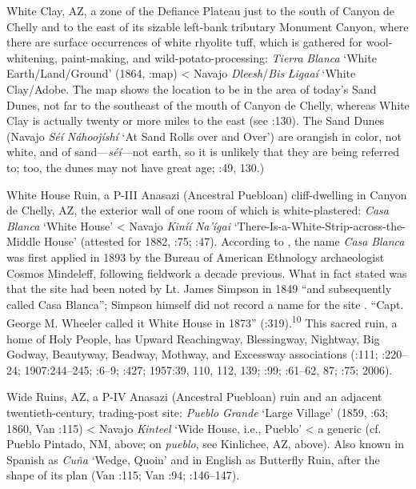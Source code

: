 White Clay, AZ, a zone of the Defiance Plateau just to the south of Canyon de Chelly and to the east of its sizable left-bank tributary Monument Canyon, where there are surface occurrences of white rhyolite tuff, which is gathered for wool-whitening, paint-making, and wild-potato-processing:  \textit{Tierra} \textit{Blanca} ‘White Earth/Land/Ground’ (1864, \citealt{Madsen2010}:map) < Navajo \textit{Dleesh}/\textit{Bis} \textit{Łigaaí} ‘White Clay/Adobe.  The map shows the location to be in the area of today’s Sand Dunes, not far to the southeast of the mouth of Canyon de Chelly, whereas White Clay is actually twenty or more miles to the east (see \citealt{Jett2010}:130).  The Sand Dunes (Navajo \textit{Séí} \textit{Náhoojíshí} ‘At Sand Rolls over and Over’) are orangish in color, not white, and of sand—\textit{séí}—not earth, so it is unlikely that they are being referred to; too, the dunes may not have great age; \citealt{Jett2001}:49, 130.)

White House Ruin, a P-III Anasazi (Ancestral Puebloan) cliff-dwelling in Canyon de Chelly, AZ, the exterior wall of one room of which is white-plastered:  \textit{Casa} \textit{Blanca} ‘White House’ < Navajo \textit{Kiníí} \textit{Na’ígai} ‘There-Is-a-White-Strip-across-the-Middle House’ (attested for 1882, \citealt{Jett2001}:75; \citealt{Linford2000}:47).  According to \citet[41]{Bailey1964a}, the name \textit{Casa} \textit{Blanca} was first applied in 1893 by the Bureau of American Ethnology archaeologist Cosmos Mindeleff, following fieldwork a decade previous.  What \citet[104]{Mindeleff1897} in fact stated was that the site had been noted by Lt. James Simpson in 1849 “and subsequently called Casa Blanca”; Simpson himself did not record a name for the site \citep[8]{McNitt1964}.  “Capt. George M. Wheeler called it White House in 1873” (\citealt{BarnesGranger1960}:319).\textsuperscript{10}  This sacred ruin, a home of Holy People, has Upward Reachingway, Blessingway, Nightway, Big Godway, Beautyway, Beadway, Mothway, and Excessway associations (\citealt{Klah1942}:111; \citealt{Matthews1902}:220–24; 1907:244–245; \citealt{Wheelwright1938}:6–9; \citealt{Wyman1970}:427; 1957:39, 110, 112, 139; \citealt{Levy1998}:99; \citealt{Haile1978}:61–62, 87; \citealt{Jett2001}:75; 2006).

Wide Ruins, AZ, a P-IV Anasazi (Ancestral Puebloan) ruin and an adjacent twentieth-century, trading-post site:  \textit{Pueblo} \textit{Grande} ‘Large Village’ (1859, \citealt{Bailey1964a}:63; 1860, Van \citealt{Valkenburgh1999}:115) < Navajo \textit{Kinteel} ‘Wide House, i.e., Pueblo’ \citep[209]{Haile1950} < a generic (cf. Pueblo Pintado, NM, above; on \textit{pueblo}, see Kinlichee, AZ, above).  Also known in Spanish as \textit{Cuña} ‘Wedge, Quoin’ and in English as Butterfly Ruin, after the shape of its plan (Van \citealt{Valkenburgh1999}:115; Van \citealt{ValkenburghWalker1945}:94; \citealt{Linford2000}:146–147).

